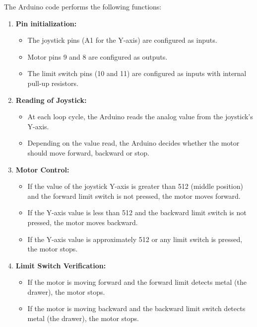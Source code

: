     The Arduino code performs the following functions:
    
    \begin{enumerate}
        \item \textbf{Pin initialization:}
        \begin{itemize}
            \item The joystick pins (A1 for the Y-axis) are configured as inputs.
            \item Motor pins 9 and 8 are configured as outputs.
            \item The limit switch pins (10 and 11) are configured as inputs with internal pull-up resistors.
        \end{itemize}
        \item \textbf{Reading of Joystick:}
        \begin{itemize}
            \item At each loop cycle, the Arduino reads the analog value from the joystick's Y-axis.
            \item Depending on the value read, the Arduino decides whether the motor should move forward, backward or stop.
        \end{itemize}
        \item \textbf{Motor Control:}
        \begin{itemize}
            \item If the value of the joystick Y-axis is greater than 512 (middle position) and the forward limit switch is not pressed, the motor moves forward.
            \item If the Y-axis value is less than 512 and the backward limit switch is not pressed, the motor moves backward.
            \item If the Y-axis value is approximately 512 or any limit switch is pressed, the motor stops.
        \end{itemize}
        \item \textbf{Limit Switch Verification:}
        \begin{itemize}
            \item If the motor is moving forward and the forward limit detects  metal (the drawer), the motor stops.
            \item If the motor is moving backward and the backward limit switch detects  metal (the drawer), the motor stops.
    
        \end{itemize}
        
    \end{enumerate}
    
